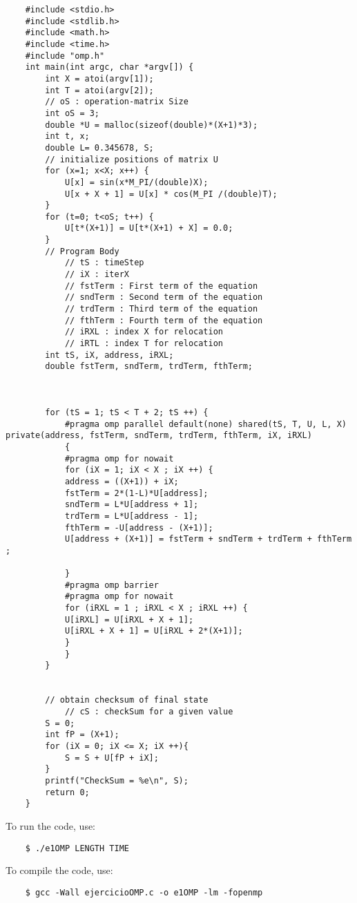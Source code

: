 \documentclass{article}
\begin{document}
\begin{verbatim}
	#include <stdio.h>
	#include <stdlib.h>
	#include <math.h>
	#include <time.h>
	#include "omp.h"
	int main(int argc, char *argv[]) {
		int X = atoi(argv[1]);
		int T = atoi(argv[2]);
		// oS : operation-matrix Size
		int oS = 3;
		double *U = malloc(sizeof(double)*(X+1)*3);
		int t, x;
		double L= 0.345678, S;
		// initialize positions of matrix U
		for (x=1; x<X; x++) {
			U[x] = sin(x*M_PI/(double)X);
			U[x + X + 1] = U[x] * cos(M_PI /(double)T);
		}
		for (t=0; t<oS; t++) {
			U[t*(X+1)] = U[t*(X+1) + X] = 0.0;
		}
		// Program Body
			// tS : timeStep
			// iX : iterX
			// fstTerm : First term of the equation
			// sndTerm : Second term of the equation
			// trdTerm : Third term of the equation
			// fthTerm : Fourth term of the equation
			// iRXL : index X for relocation
			// iRTL : index T for relocation
		int tS, iX, address, iRXL;
		double fstTerm, sndTerm, trdTerm, fthTerm;



		for (tS = 1; tS < T + 2; tS ++) {
			#pragma omp parallel default(none) shared(tS, T, U, L, X) private(address, fstTerm, sndTerm, trdTerm, fthTerm, iX, iRXL)
			{
			#pragma omp for nowait
			for (iX = 1; iX < X ; iX ++) {
			address = ((X+1)) + iX;
			fstTerm = 2*(1-L)*U[address];
			sndTerm = L*U[address + 1];
			trdTerm = L*U[address - 1];
			fthTerm = -U[address - (X+1)];
			U[address + (X+1)] = fstTerm + sndTerm + trdTerm + fthTerm ;

			}
			#pragma omp barrier
			#pragma omp for nowait
			for (iRXL = 1 ; iRXL < X ; iRXL ++) {
			U[iRXL] = U[iRXL + X + 1];
			U[iRXL + X + 1] = U[iRXL + 2*(X+1)];
			}
			}
		}


		// obtain checksum of final state
			// cS : checkSum for a given value
		S = 0;
		int fP = (X+1);
		for (iX = 0; iX <= X; iX ++){
			S = S + U[fP + iX];
		}
		printf("CheckSum = %e\n", S);
		return 0;
	}

\end{verbatim}

	To run the code, use:

\begin{verbatim}
	$ ./e1OMP LENGTH TIME
\end{verbatim}

	To compile the code, use:
\begin{verbatim}
	$ gcc -Wall ejercicioOMP.c -o e1OMP -lm -fopenmp
\end{verbatim}
\end{document}
